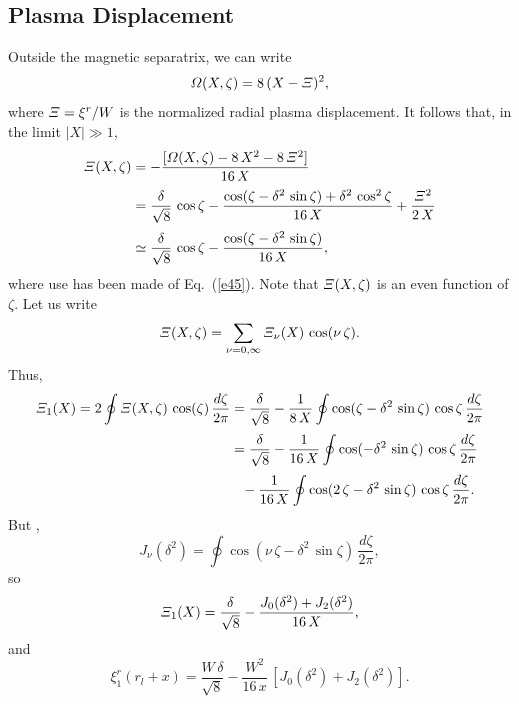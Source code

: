 \documentclass{iopjournal}
\begin{document}
\subsection{Plasma Displacement}
Outside the magnetic separatrix, we can write
\begin{equation}
{\mit\Omega}(X,\zeta) = 8\,(X-{\mit\Xi})^2,
\end{equation}
where ${\mit\Xi}= \xi^r/W$ is the normalized radial plasma displacement. It follows that, in the limit $|X|\gg 1$, 
\begin{align}
{\mit\Xi}(X,\zeta)&= -\frac{[{\mit\Omega}(X,\zeta)-8\,X^2 - 8\,{\mit\Xi}^2]}{16\,X}\nonumber\\[0.5ex]
&=\frac{\delta}{\sqrt{8}}\,\cos\zeta - \frac{\cos(\zeta-\delta^2\,\sin\zeta) +\delta^2\,\cos^2\zeta}{16\,X}+ \frac{{\mit\Xi}^2}{2\,X}\nonumber\\[0.5ex]
&\simeq \frac{\delta}{\sqrt{8}}\,\cos\zeta- \frac{\cos(\zeta-\delta^2\,\sin\zeta)}{16\,X},
\end{align}
where use has been made of Eq.~(\ref{e45}).
Note that ${\mit\Xi}(X,\zeta)$ is an even function of $\zeta$. 
Let us write
\begin{equation}
{\mit\Xi}(X,\zeta)= \sum_{\nu=0,\infty} {\mit\Xi}_\nu(X)\,\cos(\nu\,\zeta).
\end{equation}
Thus,
\begin{align}
{\mit\Xi}_1(X) =2 \oint {\mit\Xi}(X,\zeta)\,\cos(\zeta)\,\frac{d\zeta}{2\pi} &= \frac{\delta}{\sqrt{8}}-\frac{1}{8\,X}\oint\cos(\zeta-\delta^2\,\sin\zeta)\,\cos\zeta\,\frac{d\zeta}{2\pi}\nonumber \\[0.5ex]
&=\frac{\delta}{\sqrt{8}} -\frac{1}{16\,X}\oint\cos(-\delta^2\,\sin\zeta)\,\cos\zeta\,\frac{d\zeta}{2\pi}\nonumber\\[0.5ex]
&\phantom{=}- \frac{1}{16\,X}\oint\cos(2\,\zeta-\delta^2\,\sin\zeta)\,\cos\zeta\,\frac{d\zeta}{2\pi}.
\end{align}
But \cite{bc,grx}, 
\begin{equation}
J_\nu(\delta^2) = \oint\cos(\nu\,\zeta-\delta^2\,\sin\zeta)\,\frac{d\zeta}{2\pi},
\end{equation}
so
\begin{equation}
{\mit\Xi}_1(X) =\frac{\delta}{\sqrt{8}} - \frac{J_0(\delta^2) + J_2(\delta^2)}{16\,X},
\end{equation}
and
\begin{equation}\label{ea}
\xi^r_1(r_{l}+x) = \frac{W\,\delta}{\sqrt{8}} - \frac{W^2}{16\,x}\,[J_0(\delta^2)+ J_2(\delta^2)].
\end{equation}
\end{document}
